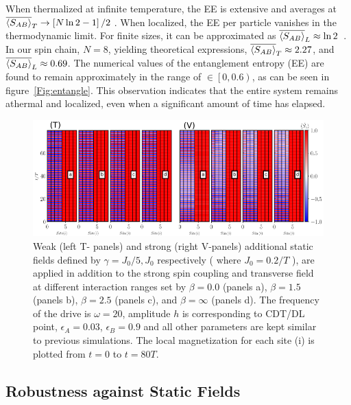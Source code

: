 \documentclass[12pt]{iopart}
\begin{document}
When thermalized at infinite temperature, the EE is extensive and averages at $\displaystyle \overline{\expval{S_{AB}}}_T\rightarrow \left[N \ln{2}-1\right]/2$ \cite{Lu2021}. When localized, the EE per particle vanishes in the thermodynamic limit. For finite sizes, it can be approximated as $\overline{\expval{S_{AB}}}_L\approx \ln{2}$~\cite{sakurai_phys_nodate}. In our spin chain, $N=8$, yielding theoretical expressions, $\overline{\expval{S_{AB}}}_T\approx 2.27$, and $\overline{\expval{S_{AB}}}_L\approx 0.69$. The numerical values of the entanglement entropy (EE) are found to remain approximately in the range of $\in\left[0,0.6\right)$, as can be seen in figure~\ref{Fig:entangle}. This observation indicates that the entire system remains athermal and localized, even when a significant amount of time has elapsed.
\begin{figure}[t!]
	\begin{center}
		\includegraphics[width=15cm]{figure11.pdf}
	\end{center}
	\caption{Weak (left T- panels) and strong (right V-panels) additional static fields defined by $\gamma = J_0/5, J_0$ respectively ( where $J_0=0.2/T$ ), are applied in addition to the strong spin coupling and transverse field at different interaction ranges set by $\beta = 0.0$ (panels a), $\beta= 1.5$ (panels b), $\beta=2.5$ (panels c), and $\beta= \infty$ (panels d). The frequency of the drive is $\omega = 20$, amplitude $h$ is corresponding to CDT/DL point, $\epsilon_A=0.03$, $\epsilon_B=0.9$ and all other parameters are kept similar to previous simulations.  The local magnetization for each site (i) is plotted from $t=0$ to $t=80 T$.}
	\label{Fig:robustness}
\end{figure}	
\subsection{\label{sec:level43} Robustness against Static Fields}
\end{document}
